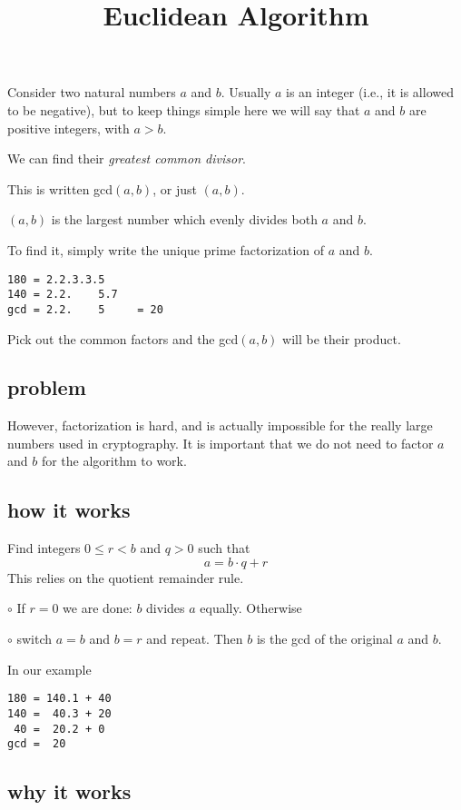 \documentclass[11pt, oneside]{article}
\title{Euclidean Algorithm}
\date{}
\begin{document}
\maketitle
\Large

Consider two natural numbers $a$ and $b$.  Usually $a$ is an integer (i.e., it is allowed to be negative), but to keep things simple here we will say that $a$ and $b$ are positive integers, with $a > b$.

We can find their \emph{greatest common divisor}.

This is written gcd$(a,b)$, or just $(a,b)$.

$(a,b)$ is the largest number which evenly divides both $a$ and $b$.

To find it, simply write the unique prime factorization of $a$ and $b$.

\begin{verbatim}
180 = 2.2.3.3.5
140 = 2.2.    5.7
gcd = 2.2.    5     = 20
\end{verbatim}

Pick out the common factors and the gcd$(a,b)$ will be their product.

\subsection*{problem}

However, factorization is hard, and is actually impossible for the really large numbers used in cryptography.  It is important that we do not need to factor $a$ and $b$ for the algorithm to work.

\subsection*{how it works}

Find integers $0 \le r < b$ and $q > 0$ such that
\[ a = b \cdot q + r \]
This relies on the quotient remainder rule.

$\circ$ If $r = 0$ we are done:  $b$ divides $a$ equally.  Otherwise

$ \circ$ switch $a = b$ and $b = r$ and repeat.  Then $b$ is the gcd of the original $a$ and $b$.  

In our example

\begin{verbatim}
180 = 140.1 + 40
140 =  40.3 + 20
 40 =  20.2 + 0
gcd =  20
\end{verbatim}

\subsection*{why it works}
\end{document}
